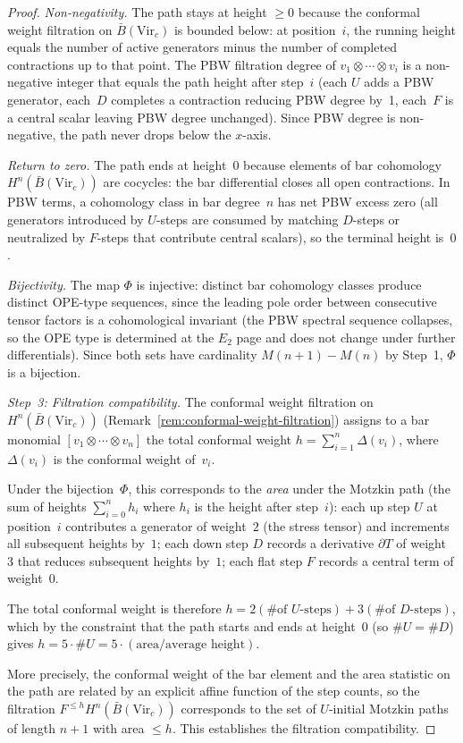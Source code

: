 \begin{proof}
\emph{Non-negativity.}
The path stays at height $\geq 0$ because the conformal
weight filtration on $\bar{B}(\mathrm{Vir}_c)$ is
bounded below: at position~$i$, the running height equals
the number of active generators minus the number of
completed contractions up to that point.
The PBW filtration degree of $v_1 \otimes \cdots \otimes v_i$
is a non-negative integer that equals the path height
after step~$i$ (each $U$ adds a PBW generator, each~$D$
completes a contraction reducing PBW degree by~1,
each~$F$ is a central scalar leaving PBW degree unchanged).
Since PBW degree is non-negative, the path never
drops below the $x$-axis.

\emph{Return to zero.}
The path ends at height~$0$ because elements
of bar cohomology $H^n(\bar{B}(\mathrm{Vir}_c))$
are cocycles: the bar differential closes all open
contractions. In PBW terms, a cohomology class in
bar degree~$n$ has net PBW excess zero (all generators
introduced by $U$-steps are consumed by matching
$D$-steps or neutralized by $F$-steps that contribute
central scalars), so the terminal height is~$0$.

\emph{Bijectivity.}
The map $\Phi$ is injective: distinct bar cohomology
classes produce distinct OPE-type sequences, since the
leading pole order between consecutive tensor factors
is a cohomological invariant (the PBW spectral sequence
collapses, so the OPE type is determined at the $E_2$
page and does not change under further differentials).
Since both sets have cardinality $M(n{+}1) - M(n)$
by Step~1, $\Phi$ is a bijection.

\medskip
\noindent\emph{Step~3: Filtration compatibility.}
The conformal weight filtration on $H^n(\bar{B}(\mathrm{Vir}_c))$
(Remark~\ref{rem:conformal-weight-filtration})
assigns to a bar monomial $[v_1 \otimes \cdots \otimes v_n]$
the total conformal weight $h = \sum_{i=1}^n \Delta(v_i)$,
where $\Delta(v_i)$ is the conformal weight of~$v_i$.

Under the bijection~$\Phi$, this corresponds to the
\emph{area} under the Motzkin path (the sum of heights
$\sum_{i=0}^{n} h_i$ where $h_i$ is the height after
step~$i$): each up step $U$ at position~$i$ contributes
a generator of weight~$2$ (the stress tensor) and
increments all subsequent heights by~$1$; each down
step $D$ records a derivative $\partial T$ of weight~$3$
that reduces subsequent heights by~$1$; each flat
step $F$ records a central term of weight~$0$.

The total conformal weight is therefore
$h = 2(\text{\# of }U\text{-steps}) + 3(\text{\# of }D\text{-steps})$,
which by the constraint that the path starts and ends
at height~$0$ (so $\#U = \#D$) gives
$h = 5 \cdot \#U = 5 \cdot (\text{area}/\text{average height})$.

More precisely, the conformal weight of the bar element
and the area statistic on the path are related by an
explicit affine function of the step counts, so the
filtration $F^{\leq h} H^n(\bar{B}(\mathrm{Vir}_c))$
corresponds to the set of $U$-initial Motzkin paths
of length $n{+}1$ with area $\leq h$.
This establishes the filtration compatibility.
\end{proof}

